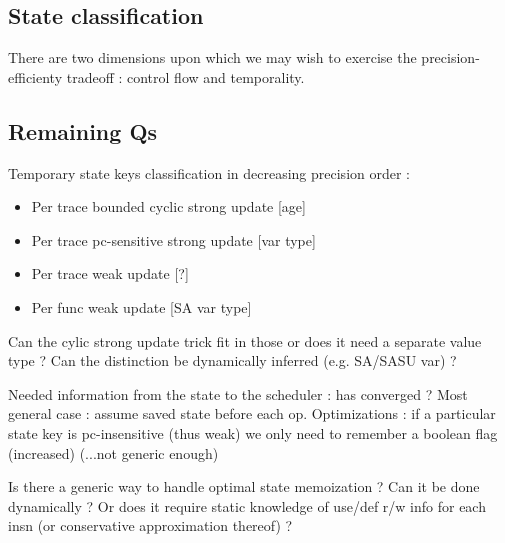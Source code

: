 \documentclass[14pt]{article}
\begin{document}
\subsection{State classification}

There are two dimensions upon which we may wish to exercise the precision-efficienty tradeoff : control flow and temporality. 


\subsection{Remaining Qs}

Temporary state keys classification in decreasing precision order :
\begin{itemize}
\item Per trace bounded cyclic strong update [age]
\item Per trace pc-sensitive strong update [var type]
\item Per trace weak update [?]
\item Per func weak update [SA var type]
\end{itemize}
Can the cylic strong update trick fit in those or does it need a separate value type ? Can the distinction be dynamically inferred (e.g. SA/SASU var) ?

Needed information from the state to the scheduler : has converged ?
Most general case : assume saved state before each op.
Optimizations :
if a particular state key is pc-insensitive (thus weak) we only need to remember a boolean flag (increased) (...not generic enough)

Is there a generic way to handle optimal state memoization ?
Can it be done dynamically ? Or does it require static knowledge of use/def r/w info for each insn (or conservative approximation thereof) ?
\end{document}
